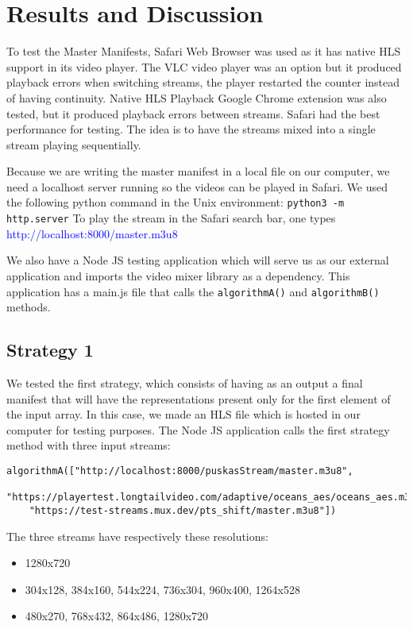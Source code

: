 \section{\textbf{Results and Discussion}}\label{sec:Evaluation} 

To test the Master Manifests, Safari Web Browser was used as it has native HLS support in its video player. The VLC video player was an option but it produced playback errors when switching streams, the player restarted the counter instead of having continuity. Native HLS Playback Google Chrome extension was also tested, but it produced playback errors between streams. Safari had the best performance for testing. The idea is to have the streams mixed into a single stream playing sequentially.

Because we are writing the master manifest in a local file on our computer, we need a localhost server running so the videos can be played in Safari. We used the following python command in the Unix environment:  \Verb|python3 -m http.server|
To play the stream in the Safari search bar, one types \textcolor{blue}{http://localhost:8000/master.m3u8}

We also have a Node JS testing application which will serve us as our external application and imports the video mixer library as a dependency. This application has a main.js file that calls the \Verb|algorithmA()| and \Verb|algorithmB()| methods.

\subsection{Strategy 1}

We tested the first strategy, which consists of having as an output a final manifest that will have the representations present only for the first element of the input array. In this case, we made an HLS file which is hosted in our computer for testing purposes. The Node JS application calls the first strategy method with three input streams:

\begin{lstlisting}
algorithmA(["http://localhost:8000/puskasStream/master.m3u8",
    "https://playertest.longtailvideo.com/adaptive/oceans_aes/oceans_aes.m3u8",
    "https://test-streams.mux.dev/pts_shift/master.m3u8"])
\end{lstlisting}

The three streams have respectively these resolutions: 

\begin{itemize}
\item 1280x720
\item 304x128, 384x160, 544x224, 736x304, 960x400, 1264x528
\item 480x270, 768x432, 864x486, 1280x720
\end{itemize}

